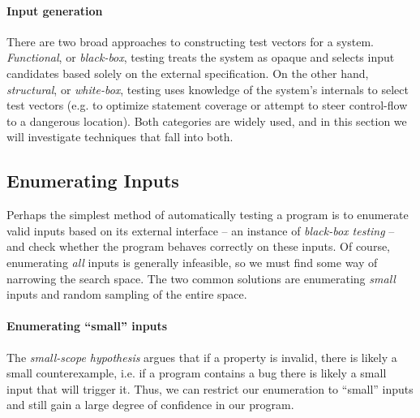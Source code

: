 \paragraph{Input generation}
There are two broad approaches to constructing test vectors for a
system.
%
\emph{Functional}, or \emph{black-box}, testing treats the
system as opaque and selects input candidates based solely on the
external specification.
%
On the other hand, \emph{structural}, or \emph{white-box}, testing uses
knowledge of the system's internals to select test vectors (e.g. to
optimize statement coverage or attempt to steer control-flow to a
dangerous location).
%
Both categories are widely used, and in this section we will investigate
techniques that fall into both.

\subsection{Enumerating Inputs}
\label{sec:enumerating-inputs}
Perhaps the simplest method of automatically testing a program is to
enumerate valid inputs based on its external interface -- an instance of
\emph{black-box testing} \cite{adrion_validation_1982} -- and check
whether the program behaves correctly on these inputs.
%
Of course, enumerating \emph{all} inputs is generally infeasible, so we
must find some way of narrowing the search space.
%
The two common solutions are enumerating \emph{small} inputs and random
sampling of the entire space.

\paragraph{Enumerating ``small'' inputs}
The \emph{small-scope hypothesis} \cite{jackson_software_2006} argues
that if a property is invalid, there is likely a small counterexample,
i.e. if a program contains a bug there is likely a small input that will
trigger it. Thus, we can restrict our enumeration to ``small'' inputs
and still gain a large degree of confidence in our program.

